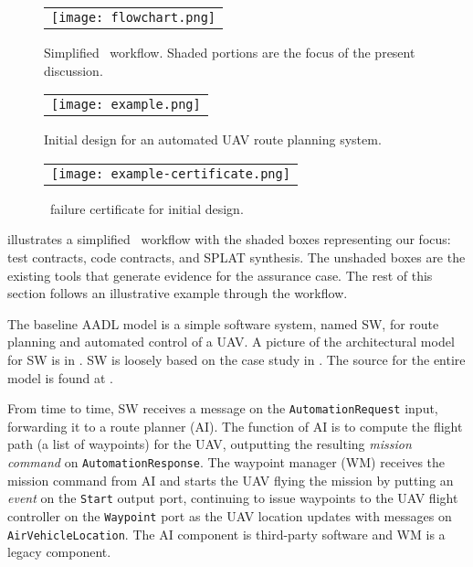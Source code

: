 \begin{figure*}
  \begin{center}
    \begin{tabular}{c}
      \texttt{[image: flowchart.png]} \\
    \end{tabular}
  \end{center}
\caption{Simplified \brfcs\ workflow. Shaded portions are the focus of the present discussion.}
\label{fig:flowchart}
\end{figure*}

\begin{figure*}[h]
  \begin{center}
    \begin{tabular}{c}
      \texttt{[image: example.png]}
    \end{tabular}
  \end{center}
\caption{Initial design for an automated UAV route planning system.}
\label{fig:example}
\end{figure*}

\begin{figure}
  \begin{center}
    \begin{tabular}{c}
      \texttt{[image: example-certificate.png]} \\
    \end{tabular}
  \end{center}
\caption{\agr\ failure certificate for initial design.}
\label{fig:example-certificate}
\end{figure}

 illustrates a simplified \brfcs\ workflow with the shaded boxes representing our focus: test contracts, code contracts, and SPLAT synthesis.
The unshaded boxes are the existing tools that generate evidence for the assurance case.
The rest of this section follows an illustrative example through the workflow.

The baseline AADL model is a simple software system, named SW, for route planning
and automated control of a UAV. A picture of the architectural
model for SW is in . SW is loosely based on
the case study in .  The source for the
entire model is found at \cite{repo}.

From time to time, SW receives a message on the \texttt{AutomationRequest} input,
forwarding it to a route planner (AI). The function of AI is to
compute the flight path (a list of waypoints) for the UAV, outputting
the resulting \emph{mission command} on \texttt{AutomationResponse}.
The waypoint manager (WM) receives the mission command from AI and
starts the UAV flying the mission by putting an \emph{event} on the
\texttt{Start} output port, continuing to issue waypoints to the UAV
flight controller on the \texttt{Waypoint} port as the UAV location
updates with messages on \texttt{AirVehicleLocation}.
The AI component is third-party
software and WM is a legacy component.

